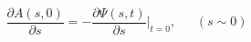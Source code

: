 \begin{equation}
\frac{\partial A(s,0)}{\partial s} =
-\frac{\partial\Psi(s,t)}{\partial s}\big|_{t=0}, \ \ \ \ \ \ \
(s \sim 0)
\label{9}
\end{equation}

